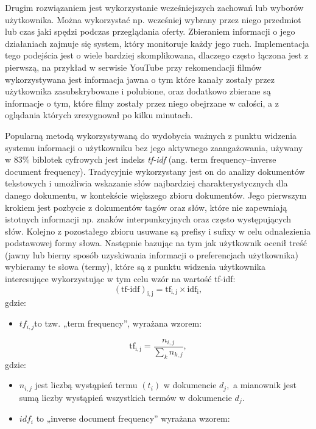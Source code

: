Drugim rozwiązaniem jest wykorzystanie wcześniejszych zachowań lub wyborów użytkownika. Można wykorzystać np. wcześniej wybrany przez niego przedmiot lub czas jaki spędzi podczas przeglądania oferty. Zbieraniem informacji o jego działaniach zajmuje się system, który monitoruje każdy jego ruch. Implementacja tego podejścia jest o wiele bardziej skomplikowana, dlaczego często łączona jest z pierwszą, na przykład w serwisie YouTube przy rekomendacji filmów wykorzystywana jest informacja jawna o tym które kanały zostały przez użytkownika zasubskrybowane i polubione, oraz dodatkowo zbierane są informacje o tym, które filmy zostały przez niego obejrzane w całości, a z oglądania których zrezygnował po kilku minutach.

Popularną metodą wykorzystywaną do wydobycia ważnych z punktu widzenia systemu informacji o użytkowniku bez jego aktywnego zaangażowania, używany w 83\% biblotek cyfrowych \cite{Research-paperrecommendersystems:aliteraturesurvey} jest indeks \textit{tf-idf} (ang. term frequency–inverse document frequency). Tradycyjnie wykorzystany jest on do analizy dokumentów tekstowych i umożliwia wskazanie słów najbardziej charakterystycznych dla danego dokumentu, w kontekście większego zbioru dokumentów. Jego pierwszym krokiem jest pozbycie z dokumentów tagów oraz słów, które nie zapewniają istotnych informacji np. znaków interpunkcyjnych oraz często występujących słów. Kolejno z pozostałego zbioru usuwane są prefisy i sufixy w celu odnalezienia podstawowej formy słowa. Następnie bazując na tym jak użytkownik ocenił treść (jawny lub bierny sposób uzyskiwania informacji o preferencjach użytkownika) wybieramy te słowa (termy), które są z punktu widzenia użytkownika interesujące wykorzystując w tym celu wzór na wartość tf-idf:
\begin{equation}
\label{tfidf}
        \mathrm{(tf\text{-}idf)_{i,j}} = \mathrm{tf_{i,j}} \times \mathrm{idf_i},
\end{equation}
gdzie:
\begin{itemize}
    \item $tf_{i, j}$to tzw. „term frequency”, wyrażana wzorem:
\end{itemize}
\begin{equation*}
    \mathrm{tf_{i,j}} = \frac{n_{i,j}}{\sum_k n_{k,j}},
\end{equation*}
gdzie: 
\begin{itemize}
    \item $n_{i,j}$ jest liczbą wystąpień termu $(t_i)$ w dokumencie $d_j,$ a mianownik jest sumą liczby wystąpień wszystkich termów w dokumencie $d_j.$
    \item $idf_{i}$ to „inverse document frequency” wyrażana wzorem:
\end{itemize}
